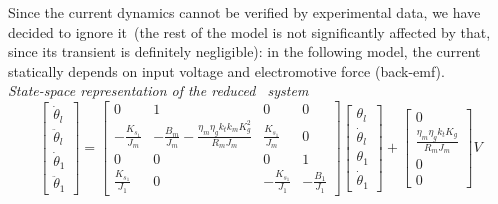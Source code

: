 Since the current dynamics cannot be verified by experimental data, we have decided to ignore it~(the rest of the model is not significantly affected by that, since its transient is definitely negligible): in the following model, the current statically depends on input voltage and electromotive force (back-emf). \\

\noindent \textit{State-space representation of the reduced \onedof\ system}
\begin{equation}
	\begin{bmatrix}
		\dot{\theta}_l \\
		\ddot{\theta}_l \\
		\dot{\theta}_1 \\
		\ddot{\theta}_1
	\end{bmatrix}
	=
	\begin{bmatrix}
		0 &1 & 0 & 0 \\
		-\frac{K_{s_1}}{J_m} & -\frac{B_m}{J_m}-\frac{\eta_m \eta_g k_t k_m K^2_g}{R_m J_m}  & \frac{K_{s_1}}{J_m} & 0 \\
		0 & 0 & 0 & 1 \\
		\frac{K_{s_1}}{J_1} & 0 & -\frac{K_{s_1}}{J_1} & -\frac{B_1}{J_1}
	\end{bmatrix}
	\begin{bmatrix}
		\theta_l \\
		\dot{\theta}_l \\
		\theta_1 \\
		\dot{\theta}_1
	\end{bmatrix}
	+
	\begin{bmatrix}
		0 \\
		\frac{\eta_m \eta_g k_t K_g}{R_m J_m} \\
		0 \\
		0
	\end{bmatrix}
	V
\end{equation}


